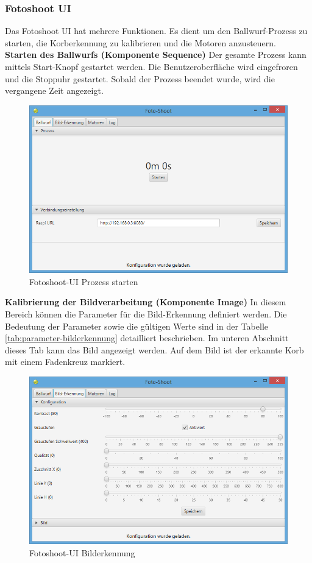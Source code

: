 \subsubsection{Fotoshoot UI}

Das Fotoshoot UI hat mehrere Funktionen. Es dient um den Ballwurf-Prozess zu starten, die Korberkennung zu kalibrieren und die Motoren anzusteuern.\\

\noindent
\textbf{Starten des Ballwurfs (Komponente Sequence)}
Der gesamte Prozess kann mittels Start-Knopf gestartet werden. Die Benutzeroberfläche wird eingefroren und die Stoppuhr gestartet. Sobald der Prozess beendet wurde, wird die vergangene Zeit angezeigt.

\begin{figure}[h!]
\centering
\includegraphics[width=0.6\linewidth]{../../fig/fotoshoot-ui/fotoshoot-ui-pi}
\caption{Fotoshoot-UI Prozess starten}
\label{fig:fotoshoot-ui-pi}
\end{figure}

\noindent
\textbf{Kalibrierung der Bildverarbeitung (Komponente Image)}
In diesem Bereich können die Parameter für die Bild-Erkennung definiert werden. Die Bedeutung der Parameter sowie die gültigen Werte sind in der Tabelle \ref{tab:parameter-bilderkennung} detailliert beschrieben. Im unteren Abschnitt dieses Tab kann das Bild angezeigt werden. Auf dem Bild ist der erkannte Korb mit einem Fadenkreuz markiert.

\begin{figure}[h!]
	\centering
	\includegraphics[width=0.6\linewidth]{../../fig/fotoshoot-ui/fotoshoot-ui-korb-erkennung}
	\caption{Fotoshoot-UI Bilderkennung}
	\label{fig:fotoshoot-ui-korb-erkennung}
\end{figure}

